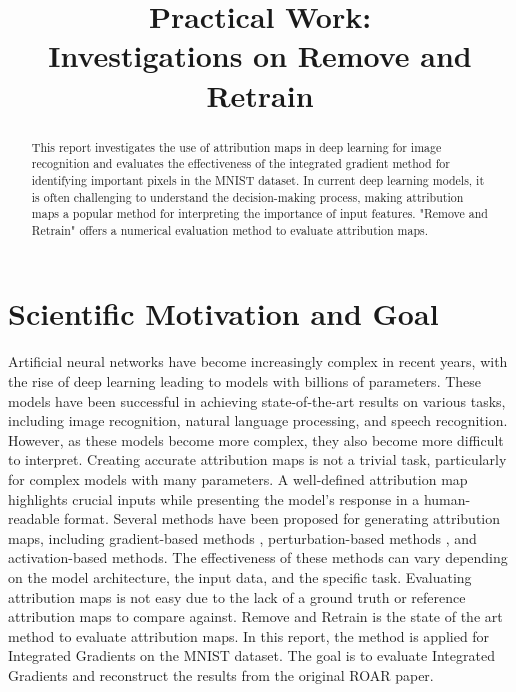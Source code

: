 \documentclass[conference]{IEEEtran}
\begin{document}
\title{Practical Work: \\ Investigations on Remove and Retrain}

\author{
}


\maketitle

\begin{abstract}
This report investigates the use of attribution maps in deep learning for image recognition and evaluates the effectiveness of the integrated gradient method for identifying important pixels in the MNIST dataset. In current deep learning models, it is often challenging to understand the decision-making process, making attribution maps a popular method for interpreting the importance of input features. "Remove and Retrain" offers a numerical evaluation method to evaluate attribution maps.
\end{abstract}


\section{Scientific Motivation and Goal}
Artificial neural networks have become increasingly complex in recent years, with the rise of deep learning leading to models with billions of parameters. These models have been successful in achieving state-of-the-art results on various tasks, including image recognition, natural language processing, and speech recognition. However, as these models become more complex, they also become more difficult to interpret. Creating accurate attribution maps is not a trivial task, particularly for complex models with many parameters. A well-defined attribution map highlights crucial inputs while presenting the model's response in a human-readable format. Several methods have been proposed for generating attribution maps, including gradient-based methods \cite{1_Integrated Gradient}, perturbation-based methods \cite{2_Perturbation}, and activation-based methods\cite{3_Activation}. The effectiveness of these methods can vary depending on the model architecture, the input data, and the specific task. Evaluating attribution maps is not easy due to the lack of a ground truth or reference attribution maps to compare against. Remove and Retrain is the state of the art method to evaluate attribution maps. In this report, the method is applied for Integrated Gradients on the MNIST dataset. The goal is to evaluate Integrated Gradients and reconstruct the results from the original ROAR paper.
\end{document}
